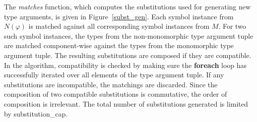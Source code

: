 \documentclass[runningheads]{llncs}
\begin{document}
The \emph{matches} function, which computes the substitutions used for generating new type arguments, is given in Figure~\ref{subst_gen}. Each symbol instance from \(N(\varphi)\) is matched against all corresponding symbol instances from \(M\).
For two such symbol instances, the types from the non-monomorphic type argument tuple are matched component-wise against the types from the monomorphic type argument tuple. The resulting substitutions are composed if they are compatible. In the algorithm, compatibility is checked by making sure the \textbf{foreach} loop has successfully iterated over all elements of the type argument tuple. If any substitutions are incompatible, the matchings are discarded. Since the composition of two compatible substitutions is commutative, the order of composition is irrelevant. The total number of substitutions generated is limited by \textcolor{ourblueviolet}{substitution\_cap}.

%
%
%
%
%
%         
%
%
%
%
\end{document}
